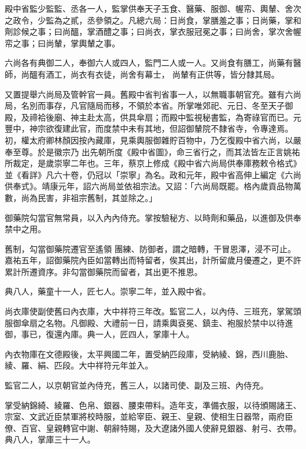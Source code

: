 \begin{pinyinscope}
 殿中省監少監監、丞各一人，監掌供奉天子玉食、醫藥、服御、幄帟、輿輦、舍次之政令，少監為之貳，丞參領之。凡總六局：日尚食，掌膳羞之事；日尚藥，掌和劑診候之事；曰尚醞，掌酒醴之事；曰尚衣，掌衣服冠冕之事；曰尚舍，掌次舍幄帟之事；曰尚輦，掌輿輦之事。



 六尚各有典御二人，奉御六人或四人，監門二人或一人。又尚食有膳工，尚藥有醫師，尚醞有酒工，尚衣有衣徒，尚舍有幕士，
 尚輦有正供等，皆分隸其局。



 又置提舉六尚局及管幹官一員。舊殿中省判省事一人，以無職事朝官充。雖有六尚局，名別而事存，凡官隨局而移，不領於本省。所掌唯郊祀、元日、冬至天子御殿，及禘袷後廟、神主赴太高，供具傘扇；而殿中監視秘書監，為寄祿官而已。元豐中，神宗欲復建此官，而度禁中未有其地，但詔御輦院不隸省寺，令專達焉。初，權太府卿林顏因按內藏庫，見乘輿服御雜貯百物中，乃乞復殿中省六尚，以嚴奉至尊。於是徽宗乃
 出先朝所度《殿中省圖》，命三省行之，而其法皆左正言姚祐所裁定，是歲崇寧二年也。三年，蔡京上修成《殿中省六尚局供奉庫務敕令格式》並《看詳》凡六十卷，仍冠以「崇寧」為名。政和元年，殿中省高伸上編定《六尚供奉式》。靖康元年，詔六尚局並依祖宗法。又詔：「六尚局既罷。格內歲貢品物萬數，尚為民害，非祖宗舊制，其並除之。」



 御藥院勾當官無常員，以入內內侍充。掌按驗秘方、以時劑和藥品，以進御及供奉禁中之用。



 舊制，勾當御藥院遷官至遙領
 團練、防御者，謂之暗轉，干冒恩澤，浸不可止。嘉祐五年，詔御藥院內臣如當轉出而特留者，俟其出，計所留歲月優遷之，更不許累計所遷資序。非勾當御藥院而留者，其出更不推恩。



 典八人，藥童十一人，匠七人。崇寧二年，並入殿中省。



 尚衣庫使副使舊曰內衣庫，大中祥符三年改。監官二人，以內侍、三班充，掌駕頭服御傘扇之名物。凡御殿、大禮前一日，請乘輿袞冕、鎮圭、袍服於禁中以待進御，事已，復還內庫。典一人，匠四人，掌庫十人。



 內衣物庫在文德殿後，太平興國二年，置受納匹段庫，受納綾、錦，西川鹿胎、綾、羅、絹、匹段。大中祥符元年並入。



 監官二人，以京朝官並內侍充，舊三人，以諸司使、副及三班、內侍充。



 掌受納錦綺、綾羅、色帛、銀器、腰束帶料。造年支，準備衣服，以待頒賜諸王、宗室、文武近臣禁軍將校時服，並給宰臣、親王、皇親、使相生日器幣，兩府臣僚、百官、皇親轉官中謝、朝辭特賜，及大遼諸外國人使辭見銀器、射弓、衣帶。典八人，掌庫三十一人。




\end{pinyinscope}
